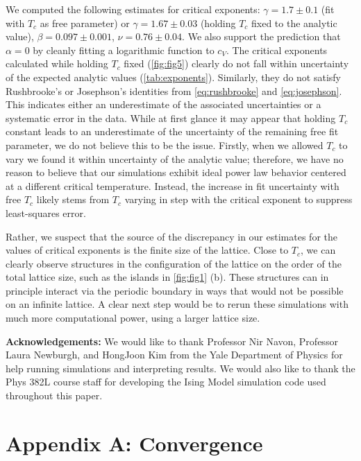 \documentclass[letter,scriptaddress,twocolumn, prl,nofootinbib]{revtex4}
\begin{document}
We computed the following estimates for critical exponents: $\gamma = 1.7 \pm 0.1$ (fit with $T_c$ as free parameter) or $\gamma = 1.67 \pm 0.03$ (holding $T_c$ fixed to the analytic value), $\beta = 0.097 \pm 0.001$, $\nu = 0.76 \pm 0.04$. We also support the prediction that $\alpha = 0$ by cleanly fitting a logarithmic function to $c_V$. The critical exponents calculated while holding $T_c$ fixed (\autoref{fig:fig5}) clearly do not fall within uncertainty of the expected analytic values (\autoref{tab:exponents}). Similarly, they do not satisfy Rushbrooke's or Josephson's identities from \autoref{eq:rushbrooke} and \autoref{eq:josephson}. This indicates either an underestimate of the associated uncertainties or a systematic error in the data. While at first glance it may appear that holding $T_c$ constant leads to an underestimate of the uncertainty of the remaining free fit parameter, we do not believe this to be the issue. Firstly, when we allowed $T_c$ to vary we found it within uncertainty of the analytic value; therefore, we have no reason to believe that our simulations exhibit ideal power law behavior centered at a different critical temperature. Instead, the increase in fit uncertainty with free $T_c$ likely stems from $T_c$ varying in step with the critical exponent to suppress least-squares error.

Rather, we suspect that the source of the discrepancy in our estimates for the values of critical exponents is the finite size of the lattice. Close to $T_c$, we can clearly observe structures in the configuration of the lattice on the order of the total lattice size, such as the islands in \autoref{fig:fig1} (b). These structures can in principle interact via the periodic boundary in ways that would not be possible on an infinite lattice. A clear next step would be to rerun these simulations with much more computational power, using a larger lattice size.

\textbf{Acknowledgements:}
	We would like to thank Professor Nir Navon, Professor Laura Newburgh, and HongJoon Kim from the Yale Department of Physics for help running simulations and interpreting results. We would also like to thank the Phys 382L course staff for developing the Ising Model simulation code used throughout this paper.
	
 


\clearpage

\appendix
\section{Appendix A: Convergence}
\end{document}
